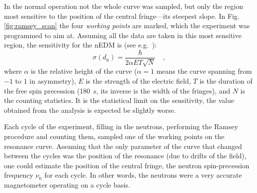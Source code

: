 In the normal operation not the whole curve was sampled, but only the region most sensitive to the position of the central fringe---its steepest slope.
In Fig.\,\ref{fig:ramsey_scan} the four \emph{working points} are marked, which the experiment was programmed to aim at.
Assuming all the data are taken in this most sensitive region, the sensitivity for the nEDM is (see e.g.~\cite{FertlThesis}):
\begin{equation}
  \label{eq:nEDM_sensitivity}
  \sigma(d_\text{n}) = \frac{\hbar}{ 2 \alpha E T \sqrt{N} } \quad ,
\end{equation}
where $\alpha$ is the relative height of the curve ($\alpha = 1$ means the curve spanning from $-1$ to $1$ in asymmetry), $E$ is the strength of the electric field, $T$ is the duration of the free spin precession (\SI{180}{\second}, its inverse is the width of the fringes), and $N$ is the counting statistics.
It is the statistical limit on the sensitivity, the value obtained from the analysis is expected be slightly worse.

Each cycle of the experiment, filling in the neutrons, performing the Ramsey procedure and counting them, sampled one of the working points on the resonance curve.
Assuming that the only parameter of the curve that changed between the cycles was the position of the resonance (due to drifts of the field), one could estimate the position of the central fringe, the neutron spin-precession frequency $\nu_\text{n}$ for each cycle.
In other words, the neutrons were a very accurate magnetometer operating on a cycle basis.

